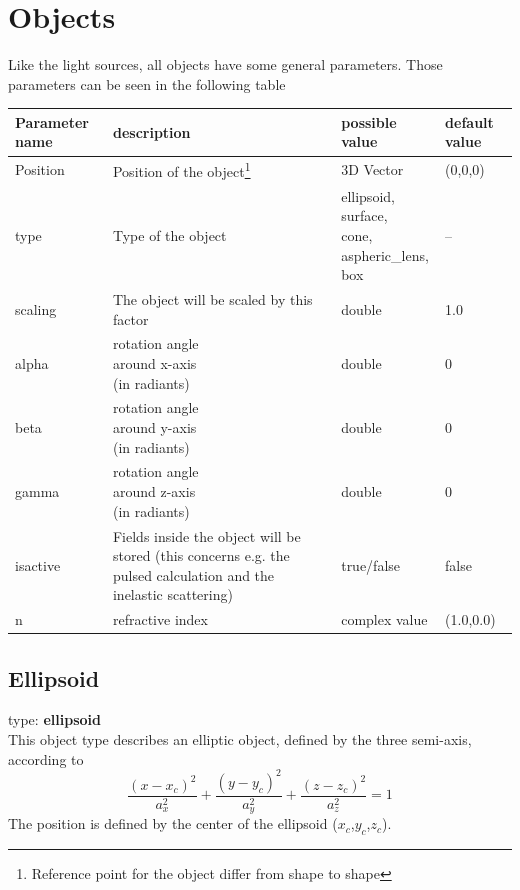 \documentclass[a4paper,html,11pt,openany]{book}
\begin{document}
 \section{Objects}
 Like the light sources, all objects have some general parameters. Those parameters can be seen in the following table
 
 \vspace{1em}
 \begin{longtable}{p{2cm}|m{3.5cm}|m{3.0cm}|p{1.7cm}}
 Parameter name & description  & possible value & default value\\
 \hline
  Position & Position of the object\footnote{Reference point for the object differ from shape to shape} & 3D Vector & (0,0,0) \\
  \hline
  type & Type of the object  & \parbox{3cm}{ellipsoid,\\surface,\\cone,\\aspheric\_lens,\\box} & --  \\
  \hline   
  scaling & The object will be scaled by this factor & double & 1.0 \\
  \hline
  alpha & \parbox{3.5cm}{rotation angle\\around x-axis\\(in radiants)} & double & 0 \\ 
    \hline
  beta & \parbox{3.5cm}{rotation angle\\around y-axis\\(in radiants)} & double & 0 \\ 
      \hline
  gamma & \parbox{3.5cm}{rotation angle\\around z-axis\\(in radiants)} & double & 0 \\ 
  \hline
  isactive & \parbox{3.5cm}{Fields inside the object will be stored (this concerns e.g. the pulsed calculation and the inelastic scattering)} & true/false & false \\
  \hline
  n & refractive index & complex value & (1.0,0.0) 
\end{longtable} 
  
\subsection{Ellipsoid}
 type: \textbf {ellipsoid} \\
 This object type describes an elliptic object, defined by the three semi-axis, according to
  \begin{equation}
  \frac{(x-x_c)^2}{a_x^2}+\frac{(y-y_c)^2}{a_y^2}+\frac{(z-z_c)^2}{a_z^2}=1
\end{equation}   
The position is defined by the center of the ellipsoid ($x_c$,$y_c$,$z_c$).
\end{document}
